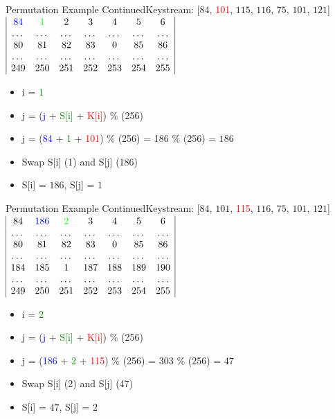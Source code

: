 \documentclass[
	aspectratio=169,	%
	onlytextwidth,		%
	t,					%
	]{beamer}
\begin{document}
\begin{frame}{Permutation Example Continued}{Keystream: [$84$, \textcolor{red} {101}, $115$, $116$, $75$, $101$, $121$]}
	$\begin{array}{|ccccccc|}
		\textcolor{blue}{84} & \textcolor{green}{1} & 2 & 3 & 4 & 5 & 6 \\
		\dots & \dots & \dots & \dots & \dots & \dots & \dots \\
		80 & 81 & 82 & 83 & 0 & 85 & 86 \\
		\dots & \dots & \dots & \dots & \dots & \dots & \dots \\
		249 & 250 & 251 & 252 & 253 & 254 & 255 \\
	\end{array}$
	\begin{itemize}
		\item i = \textcolor{green}{1}
		\item j = (\textcolor{blue} {j} + \textcolor{green}{S[i]} + \textcolor{red}{K[i]}) $\%$ (256)
		\item j = (\textcolor{blue} {84} + \textcolor{green} {1} + \textcolor{red} {101}) $\%$ (256) = 186 $\%$ (256) = $186$
		\item Swap S[i] (1) and S[j] (186)
		\item S[i] = $186$, S[j] = $1$
	\end{itemize}
\end{frame}

\begin{frame}{Permutation Example Continued}{Keystream: [$84$, $101$, \textcolor{red} {115}, $116$, $75$, $101$, $121$]}
	$\begin{array}{|ccccccc|}
		84 & \textcolor{blue} {186} & \textcolor{green}{2} & 3 & 4 & 5 & 6 \\
		\dots & \dots & \dots & \dots & \dots & \dots & \dots \\
		80 & 81 & 82 & 83 & 0 & 85 & 86 \\
		\dots & \dots & \dots & \dots & \dots & \dots & \dots \\
		184 & 185 & 1 & 187 & 188 & 189 & 190\\
		\dots & \dots & \dots & \dots & \dots & \dots & \dots \\
		249 & 250 & 251 & 252 & 253 & 254 & 255 \\
	\end{array}$
	\begin{itemize}
		\item i = \textcolor{green}{2}
		\item j = (\textcolor{blue} {j} + \textcolor{green}{S[i]} + \textcolor{red}{K[i]}) $\%$ (256)
		\item j = (\textcolor{blue} {186} + \textcolor{green} {2} + \textcolor{red} {115}) $\%$ (256) = 303 $\%$ (256) = $47$
		\item Swap S[i] (2) and S[j] (47)
		\item S[i] = $47$, S[j] = $2$
	\end{itemize}
\end{frame}
\end{document}
